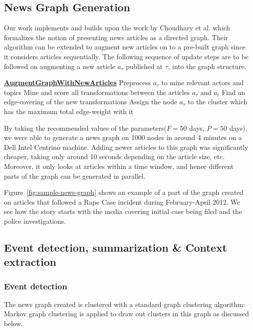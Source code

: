 \subsection{News Graph Generation}\label{sec:graph-desc}
Our work implements and builds upon the work by Choudhary et
al.\cite{choudhary@ecir2008} which formalizes the notion of presenting
news articles as a directed graph.  Their algorithm can be extended to
augment new articles on to a pre-built graph since it considers
articles sequentially.  The following sequence of update steps are to
be followed on augmenting a new article $a_\tau$ published at $\tau$, into
the graph structure.
\begin{algorithmic}
  \State \textbf{\underline{AugmentGraphWithNewArticles}}
  \State {}
  \State Preprocess $a_\tau$ to mine relevant actors and topics
    \State Mine and score all transformations between the articles $a_\tau$ and $a_t$
  \EndFor
  \State Find an edge-covering of the new transformations
  \State Assign the node $a_\tau$ to the cluster which has the maximum total edge-weight with it
\end{algorithmic}

By taking the recommended values of the parameters($F=50$ days, $P=50$ days), we were able to generate a news graph on 1000 nodes in around 4 minutes on a Dell Intel Centrino machine.
Adding newer articles to this graph was significantly cheaper, taking only around 10 seconds depending on the article size, etc.
Moreover, it only looks at articles within a time window, and hence different parts of the graph can be generated in parallel.

Figure~\ref{fig:sample-news-graph}  shows an example of a part of the graph created on articles that followed a Rape Case incident during February-April 2012. We see how the
story starts with the media covering initial case being filed and the police investigations.

\subsection{Event detection, summarization \& Context extraction}\label{sec:event-detection-summary-context}
\subsubsection*{Event detection}
The news graph created is clustered with a standard graph clustering algorithm: Markov graph clustering \cite{Dongen00a} is applied to draw out clusters in this graph as discussed below.

